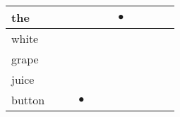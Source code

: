 \documentclass[landscape]{article}
\newcommand{\ssp}{\hspace{2pt}}
\newcommand{\mex}{\cellcolor{g}$\bullet$}
\begin{document}
\begin{tabular}{|l|p{10pt}|p{10pt}|p{10pt}|p{10pt}|p{10pt}|p{10pt}|p{10pt}|p{10pt}|p{10pt}|p{10pt}|}
\hline
\ssp \cellcolor{ref5}the \ssp&\hspace{2pt}&\hspace{2pt}&\hspace{2pt}&\hspace{2pt}&\hspace{2pt}&\hspace{2pt}\mex&\hspace{2pt}&\hspace{2pt}&\hspace{2pt}&\hspace{2pt}\\
\hline
\ssp white \ssp&\hspace{2pt}&\hspace{2pt}&\hspace{2pt}&\hspace{2pt}&\hspace{2pt}&\hspace{2pt}&\hspace{2pt}&\hspace{2pt}&\hspace{2pt}&\hspace{2pt}\\
\hline
\ssp grape \ssp&\hspace{2pt}&\hspace{2pt}&\hspace{2pt}&\hspace{2pt}&\hspace{2pt}&\hspace{2pt}&\hspace{2pt}&\hspace{2pt}&\hspace{2pt}&\hspace{2pt}\\
\hline
\ssp juice \ssp&\hspace{2pt}&\hspace{2pt}&\hspace{2pt}&\hspace{2pt}&\hspace{2pt}&\hspace{2pt}&\hspace{2pt}&\hspace{2pt}&\hspace{2pt}&\hspace{2pt}\\
\hline
\ssp \cellcolor{ref2}button \ssp&\hspace{2pt}&\hspace{2pt}&\hspace{2pt}\mex&\hspace{2pt}&\hspace{2pt}&\hspace{2pt}&\hspace{2pt}&\hspace{2pt}&\hspace{2pt}&\hspace{2pt}\\

\end{tabular}
\end{document}
